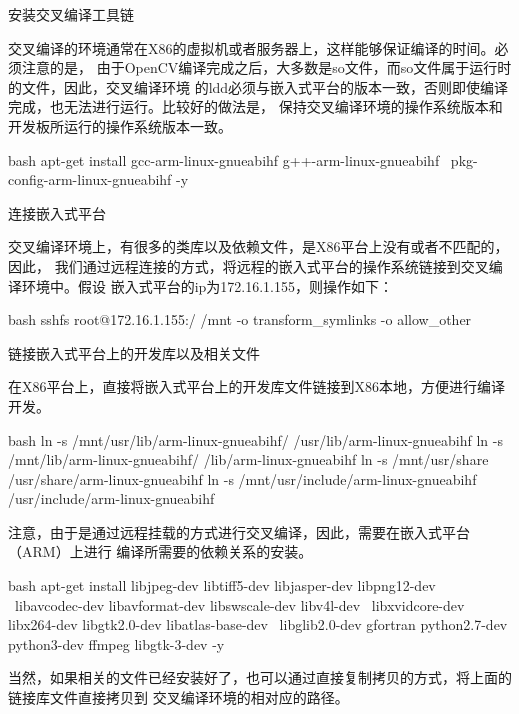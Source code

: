 \begin{outline}[enumerate]

\1 安装交叉编译工具链

交叉编译的环境通常在X86的虚拟机或者服务器上，这样能够保证编译的时间。必须注意的是，
由于OpenCV编译完成之后，大多数是so文件，而so文件属于运行时的文件，因此，交叉编译环境
的ldd必须与嵌入式平台的版本一致，否则即使编译完成，也无法进行运行。比较好的做法是，
保持交叉编译环境的操作系统版本和开发板所运行的操作系统版本一致。
\begin{code-in-enumerate}{bash}
apt-get install gcc-arm-linux-gnueabihf g++-arm-linux-gnueabihf \
    pkg-config-arm-linux-gnueabihf -y
\end{code-in-enumerate}

\1 连接嵌入式平台

交叉编译环境上，有很多的类库以及依赖文件，是X86平台上没有或者不匹配的，因此，
我们通过远程连接的方式，将远程的嵌入式平台的操作系统链接到交叉编译环境中。假设
嵌入式平台的ip为172.16.1.155，则操作如下：
\begin{code-in-enumerate}{bash}
sshfs root@172.16.1.155:/ /mnt -o transform_symlinks -o allow_other
\end{code-in-enumerate}

\1 链接嵌入式平台上的开发库以及相关文件

在X86平台上，直接将嵌入式平台上的开发库文件链接到X86本地，方便进行编译开发。
\begin{code-in-enumerate}{bash}
ln -s /mnt/usr/lib/arm-linux-gnueabihf/ /usr/lib/arm-linux-gnueabihf
ln -s /mnt/lib/arm-linux-gnueabihf/ /lib/arm-linux-gnueabihf
ln -s /mnt/usr/share /usr/share/arm-linux-gnueabihf
ln -s /mnt/usr/include/arm-linux-gnueabihf /usr/include/arm-linux-gnueabihf
\end{code-in-enumerate}

注意，由于是通过远程挂载的方式进行交叉编译，因此，需要在嵌入式平台（ARM）上进行
编译所需要的依赖关系的安装。
\begin{code-in-enumerate}{bash}
apt-get install libjpeg-dev libtiff5-dev libjasper-dev libpng12-dev \
    libavcodec-dev libavformat-dev libswscale-dev libv4l-dev \
    libxvidcore-dev libx264-dev libgtk2.0-dev libatlas-base-dev \
    libglib2.0-dev gfortran python2.7-dev python3-dev ffmpeg libgtk-3-dev -y
\end{code-in-enumerate}
当然，如果相关的文件已经安装好了，也可以通过直接复制拷贝的方式，将上面的链接库文件直接拷贝到
交叉编译环境的相对应的路径。


\end{outline}
